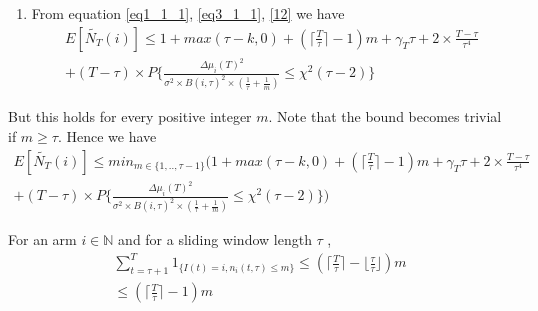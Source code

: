 \documentclass[compress, serif, onlymath, professionalfonts]{beamer}
\begin{document}
\begin{frame}[t,allowframebreaks]
\begin{enumerate}
\begin{itemize}
\end{itemize}
\item From equation \ref{eq1_1_1}, \ref{eq3_1_1}, \ref{12} we have \\

\begin{multline}
E[\tilde{N_T}(i)] \leq 1 + max(\tau-k,0)+( \lceil{\frac{T}{\tau}}\rceil-1)m+\gamma_T\tau+2\times\frac{T-\tau}{\tau^4}\\+ (T-\tau)\times P\{\frac{\Delta \mu_i(T)^2}{\sigma^2 \times B(i,\tau)^2 \times (\frac{1}{\tau}+\frac{1}{m})} \leq \chi^2(\tau-2)\}
\end{multline}
\end{enumerate}
But this holds for every positive integer $m$. Note that the bound becomes trivial if $m \geq \tau$. 
Hence we have
\begin{multline}
E[\tilde{N_T}(i)] \leq min_{m \in \{1,..,\tau-1\}}(1 + max(\tau-k,0)+( \lceil{\frac{T}{\tau}}\rceil-1)m+\gamma_T\tau+2\times\frac{T-\tau}{\tau^4}\\+ (T-\tau)\times P\{\frac{\Delta \mu_i(T)^2}{\sigma^2 \times B(i,\tau)^2 \times (\frac{1}{\tau}+\frac{1}{m})} \leq \chi^2(\tau-2)\})
\end{multline}


\end{frame}
\begin{frame}[t,allowframebreaks]
\begin{lemma}\label{lem_2}
For an arm $i \in \mathbb{N}$ and for a sliding window length $\tau$ ,\begin{multline}\sum_{t=\tau+1}^{T}1_{\{I(t)=i, n_i(t,\tau) \leq m\}} \leq( \lceil{\frac{T}{\tau}}\rceil-\lfloor{\frac{\tau}{\tau}}\rfloor) m \\ \leq( \lceil{\frac{T}{\tau}}\rceil-1) m
\end{multline}
\end{lemma}
\end{frame}
\end{document}
